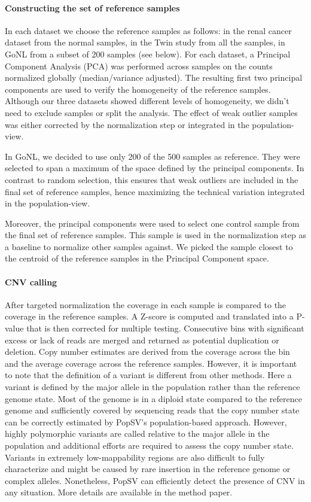 \paragraph{Constructing the set of reference samples}
In each dataset we choose the reference samples as follows: in the renal cancer dataset from the normal samples, in the Twin study from all the samples, in GoNL from a subset of 200 samples (see below).
For each dataset, a Principal Component Analysis (PCA) was performed across samples on the counts normalized globally (median/variance adjusted).
The resulting first two principal components are used to verify the homogeneity of the reference samples.
Although our three datasets showed different levels of homogeneity, we didn't need to exclude samples or split the analysis.
The effect of weak outlier samples was either corrected by the normalization step or integrated in the population-view.

In GoNL, we decided to use only 200 of the 500 samples as reference.
They were selected to span a maximum of the space defined by the principal components.
In contrast to random selection, this ensures that weak outliers are included in the final set of reference samples, hence maximizing the technical variation integrated in the population-view.

Moreover, the principal components were used to select one control sample from the final set of reference samples.
This sample is used in the normalization step as a baseline to normalize other samples against.
We picked the sample closest to the centroid of the reference samples in the Principal Component space.

\paragraph{CNV calling}
After targeted normalization the coverage in each sample is compared to the coverage in the reference samples.
A Z-score is computed and translated into a P-value that is then corrected for multiple testing.
Consecutive bins with significant excess or lack of reads are merged and returned as potential duplication or deletion.
Copy number estimates are derived from the coverage across the bin and the average coverage across the reference samples.
However, it is important to note that the definition of a variant is different from other methods.
Here a variant is defined by the major allele in the population rather than the reference genome state.
Most of the genome is in a diploid state compared to the reference genome and sufficiently covered by sequencing reads that the copy number state can be correctly estimated by {\sf PopSV}'s population-based approach.
However, highly polymorphic variants are called relative to the major allele in the population and additional efforts are required to assess the copy number state.
Variants in extremely low-mappability regions are also difficult to fully characterize and might be caused by rare insertion in the reference genome or complex alleles.
Nonetheless, {\sf PopSV} can efficiently detect the presence of CNV in any situation.
More details are available in the method paper\cite{Monlong2018}.

